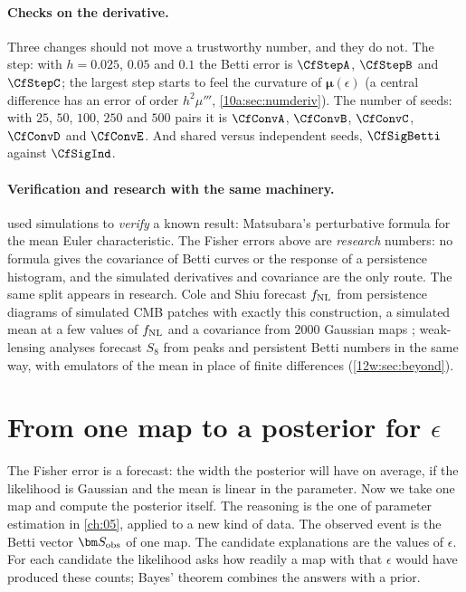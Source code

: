 \paragraph{Checks on the derivative.} Three changes should not move a trustworthy number, and they do not. The step: with
$h=0.025$, $0.05$ and $0.1$ the Betti error is $\CfStepA$, $\CfStepB$ and $\CfStepC$; the largest step starts to feel the curvature
of $\bm\mu(\epsilon)$ (a central difference has an error of order $h^2\mu'''$, \cref{10a:sec:numderiv}). The number of seeds: with
$25$, $50$, $100$, $250$ and $500$ pairs it is $\CfConvA$, $\CfConvB$, $\CfConvC$, $\CfConvD$ and $\CfConvE$. And shared versus
independent seeds, $\CfSigBetti$ against $\CfSigInd$.

\paragraph{Verification and research with the same machinery.}  used simulations to \emph{verify} a known result: Matsubara's perturbative formula for the mean Euler
characteristic. The Fisher errors above are \emph{research} numbers: no formula gives the covariance of Betti curves or the
response of a persistence histogram, and the simulated derivatives and covariance are the only route. The same split appears in
research. Cole and Shiu forecast $f_{\rm NL}$ from persistence diagrams of simulated CMB patches with exactly this construction,
a simulated mean at a few values of $f_{\rm NL}$ and a covariance from $2000$ Gaussian maps \cite{ColeShiu2018}; weak-lensing analyses
forecast $S_8$ from peaks and persistent Betti numbers in the same way, with emulators of the mean in place of finite differences
\cite{Heydenreich2021} (\cref{12w:sec:beyond}).
\section{From one map to a posterior for $\epsilon$}
\label{12c:sec:posterior}

The Fisher error is a forecast: the width the posterior will have on average, if the likelihood is Gaussian and the mean is
linear in the parameter. Now we take one map and compute the posterior itself. The reasoning is the one of parameter
estimation in \cref{ch:05}, applied to a new kind of data. The observed event is the Betti vector $\bm S_{\rm obs}$ of one map.
The candidate explanations are the values of $\epsilon$. For each candidate the likelihood asks how readily a map with that
$\epsilon$ would have produced these counts; Bayes' theorem combines the answers with a prior.


